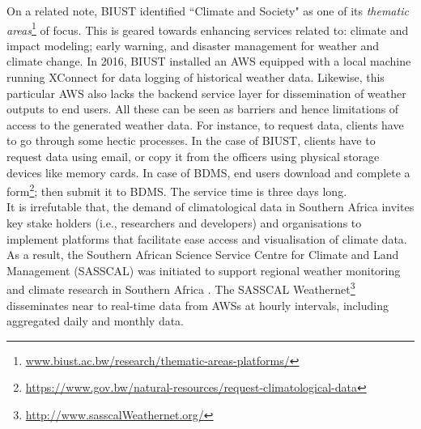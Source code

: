 \documentclass[a4paper, 10pt, conference]{ieeeconf}      %
\begin{document}
\newpage
\noindent
   On a related note,  BIUST identified ``Climate and Society" as one of its   \emph{thematic areas}\footnote{\url{www.biust.ac.bw/research/thematic-areas-platforms/}\label{biust}}  of focus. This  is geared towards enhancing services related to:  climate and impact modeling; early warning, and  disaster     management for weather and climate change.
In 2016, BIUST installed  an AWS equipped with a local machine running XConnect %
for data logging of historical weather data.
    Likewise, this particular AWS also lacks the backend service layer for dissemination of weather outputs to end users. All these can be seen as  barriers and hence limitations of access to the generated weather data.
For instance, to request data, clients have to go through some hectic   processes. In the case of BIUST, clients have to request data using email, or copy it from the officers using physical storage devices like memory cards. In case of BDMS, end users  download and complete a form\footnote{\url{https://www.gov.bw/natural-resources/request-climatological-data}\label{Formo}};  then submit it to   BDMS. The service time is three    days long.\\
  
It is irrefutable that, the  demand of climatological data in Southern Africa %
 invites key stake holders (i.e., researchers and developers) and organisations to implement platforms that facilitate ease access and visualisation of climate data.
As a result, the Southern African Science Service Centre
for Climate and Land Management (SASSCAL) was
initiated \cite{helmschrot2015sasscal} to support regional weather monitoring and climate
research in Southern Africa \cite{muche2018sasscal}. The SASSCAL Weathernet\footnote{\url{http://www.sasscalWeathernet.org/}\label{Weatherneto}} %
disseminates near to real-time  data  from AWSs at    hourly intervals, including aggregated daily and monthly  data. 
\end{document}
